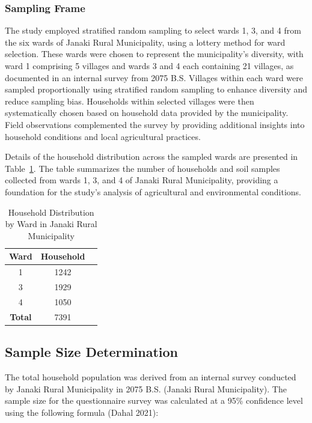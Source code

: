 \subsubsection{Sampling Frame}
The study employed stratified random sampling to select wards 1, 3, and 4 from the six wards of Janaki Rural Municipality, using a lottery method for ward selection. These wards were chosen to represent the municipality’s diversity, with ward 1 comprising 5 villages and wards 3 and 4 each containing 21 villages, as documented in an internal survey from 2075 B.S. Villages within each ward were sampled proportionally using stratified random sampling to enhance diversity and reduce sampling bias. Households within selected villages were then systematically chosen based on household data provided by the municipality. Field observations complemented the survey by providing additional insights into household conditions and local agricultural practices.

Details of the household distribution across the sampled wards are presented in Table~\ref{tab:household_distribution}. The table summarizes the number of households and soil samples collected from wards 1, 3, and 4 of Janaki Rural Municipality, providing a foundation for the study’s analysis of agricultural and environmental conditions.

\begin{table}[h]
\centering
\caption{Household Distribution by Ward in Janaki Rural Municipality}
\label{tab:household_distribution}

\begin{tabular}{|c|c|c|}
\hline
\textbf{Ward} & \textbf{Household}  \\ \hline
1 & 1242  \\ \hline
3 & 1929  \\ \hline
4 & 1050 \\ \hline
\textbf{Total} & 7391 \\ \hline
\end{tabular}
\end{table}

\subsection{Sample Size Determination}  
The total household population was derived from an internal survey conducted by Janaki Rural Municipality in 2075 B.S. (Janaki Rural Municipality). The sample size for the questionnaire survey was calculated at a 95\% confidence level using the following formula (Dahal 2021):


